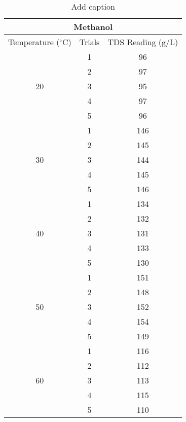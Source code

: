 

\begin{table}[H]
  \centering
  \caption{Add caption}
    \begin{tabular}{ccc}
    \toprule
    \multicolumn{3}{c}{Methanol} \\
    \midrule
    Temperature ($^\circ$C) & Trials & TDS Reading (g/L)  \\
    \midrule
    \multirow{5}[10]{*}{20} & 1     & 96 \\
\cmidrule{2-3}          & 2     & 97 \\
\cmidrule{2-3}          & 3     & 95 \\
\cmidrule{2-3}          & 4     & 97 \\
\cmidrule{2-3}          & 5     & 96 \\
    \midrule
    \multirow{5}[10]{*}{30} & 1     & 146 \\
\cmidrule{2-3}          & 2     & 145 \\
\cmidrule{2-3}          & 3     & 144 \\
\cmidrule{2-3}          & 4     & 145 \\
\cmidrule{2-3}          & 5     & 146 \\
    \midrule
    \multirow{5}[10]{*}{40} & 1     & 134 \\
\cmidrule{2-3}          & 2     & 132 \\
\cmidrule{2-3}          & 3     & 131 \\
\cmidrule{2-3}          & 4     & 133 \\
\cmidrule{2-3}          & 5     & 130 \\
    \midrule
    \multirow{5}[10]{*}{50} & 1     & 151 \\
\cmidrule{2-3}          & 2     & 148 \\
\cmidrule{2-3}          & 3     & 152 \\
\cmidrule{2-3}          & 4     & 154 \\
\cmidrule{2-3}          & 5     & 149 \\
    \midrule
    \multirow{5}[10]{*}{60} & 1     & 116 \\
\cmidrule{2-3}          & 2     & 112 \\
\cmidrule{2-3}          & 3     & 113 \\
\cmidrule{2-3}          & 4     & 115 \\
\cmidrule{2-3}          & 5     & 110 \\
    \bottomrule
    \end{tabular}%
  \label{tab:addlabel}%
\end{table}%


